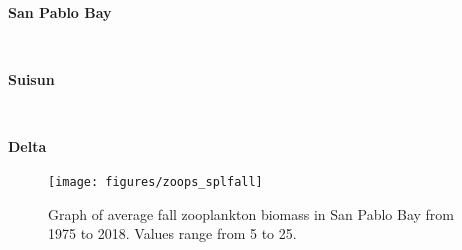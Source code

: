 \documentclass[
]{book}
\begin{document}
\begin{panel-grid}

\begin{columns-nocenter}

\begin{column800}

\textbf{San Pablo Bay}

\end{column800}

\begin{column40}

~

\end{column40}

\begin{column800}

\textbf{Suisun}

\end{column800}

\begin{column40}

~

\end{column40}

\begin{column800}

\textbf{Delta}

\end{column800}

\end{columns-nocenter}

\begin{columns-nocenter}

\begin{column800}

\begin{expand}

\begin{figure}
\texttt{[image: figures/zoops\_splfall]} \caption{Graph of average fall zooplankton biomass in San Pablo Bay from 1975 to 2018. Values range from 5 to 25.}\label{fig:unnamed-chunk-115}
\end{figure}

\end{expand}

\end{column800}

\begin{column40}

~

\end{column40}


\end{columns-nocenter}
\end{panel-grid}
\end{document}
